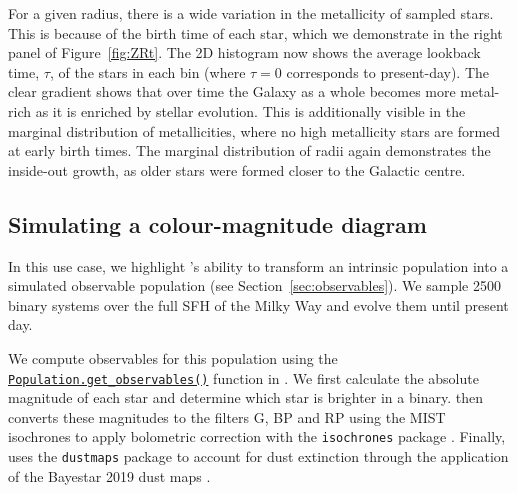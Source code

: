 \documentclass[twocolumn, twocolappendix, oneside]{aastex631}
\newcommand{\codestyle}[1]{{\color{codecolour} \texttt{#1}}}
\begin{document}
For a given radius, there is a wide variation in the metallicity of sampled stars. This is because of the birth time of each star, which we demonstrate in the right panel of Figure~\ref{fig:ZRt}. The 2D histogram now shows the average lookback time, $\tau$, of the stars in each bin (where $\tau = 0$ corresponds to present-day). The clear gradient shows that over time the Galaxy as a whole becomes more metal-rich as it is enriched by stellar evolution. This is additionally visible in the marginal distribution of metallicities, where no high metallicity stars are formed at early birth times. The marginal distribution of radii again demonstrates the inside-out growth, as older stars were formed closer to the Galactic centre.



\subsection{Simulating a \gaia colour-magnitude diagram}

In this use case, we highlight \cogsworth's ability to transform an intrinsic population into a simulated observable population (see Section~\ref{sec:observables}). We sample 2500 binary systems over the full SFH of the Milky Way and evolve them until present day.

We compute observables for this population using the \href{https://cogsworth.readthedocs.io/en/latest/api/cogsworth.pop.Population.html#cogsworth.pop.Population.get_observables}{\codestyle{Population.get\_observables()}} function in \cogsworth. We first calculate the absolute magnitude of each star and determine which star is brighter in a binary. \cogsworth then converts these magnitudes to the \gaia filters G, BP and RP using the MIST isochrones to apply bolometric correction with the \texttt{isochrones} package \citep{Morton+2015:2015ascl.soft03010M, Dotter+2016, Choi+2016:2016ApJ...823..102C, Paxton2011, Paxton2013, Paxton2015}. Finally, \cogsworth uses the \texttt{dustmaps} package to account for dust extinction through the application of the Bayestar 2019 dust maps \citep{2018JOSS....3..695M, Bayestar}.
\end{document}
